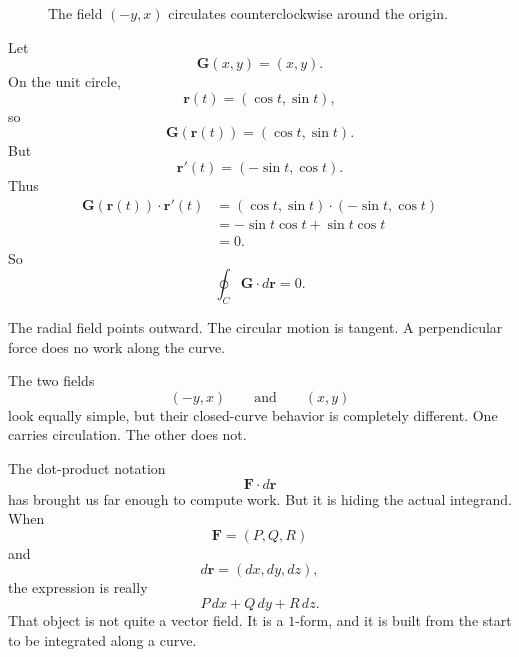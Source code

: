 \begin{figure}[h]
\centering
{}
\caption{The field \((-y,x)\) circulates counterclockwise around the origin.}
\end{figure}

\begin{example}
Let
\[
    \mathbf G(x,y)=(x,y).
\]
On the unit circle,
\[
    \mathbf r(t)=(\cos t,\sin t),
\]
so
\[
    \mathbf G(\mathbf r(t))=(\cos t,\sin t).
\]
But
\[
    \mathbf r'(t)=(-\sin t,\cos t).
\]
Thus
\[
\begin{aligned}
\mathbf G(\mathbf r(t))\cdot\mathbf r'(t)
&=
(\cos t,\sin t)\cdot(-\sin t,\cos t)\\
&=
-\sin t\cos t+\sin t\cos t\\
&=
0.
\end{aligned}
\]
So
\[
\boxed{
    \oint_C \mathbf G\cdot d\mathbf r=0.
}
\]

The radial field points outward.  The circular motion is tangent.  A perpendicular force
does no work along the curve.
\end{example}

The two fields
\[
    (-y,x)
    \qquad\text{and}\qquad
    (x,y)
\]
look equally simple, but their closed-curve behavior is completely different.  One
carries circulation.  The other does not.

The dot-product notation
\[
    \mathbf F\cdot d\mathbf r
\]
has brought us far enough to compute work.  But it is hiding the actual integrand.
When
\[
    \mathbf F=(P,Q,R)
\]
and
\[
    d\mathbf r=(dx,dy,dz),
\]
the expression is really
\[
    P\,dx+Q\,dy+R\,dz.
\]
That object is not quite a vector field.  It is a \(1\)-form, and it is built from the
start to be integrated along a curve.

